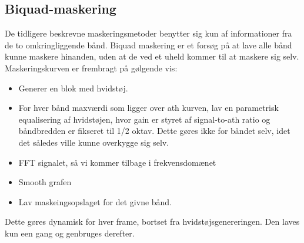 \subsection*{Biquad-maskering}
De tidligere beskrevne maskeringsmetoder benytter sig kun af
informationer fra de to omkringliggende bånd. Biquad maskering er et
forsøg på at lave alle bånd kunne maskere hinanden, uden at de ved et
uheld kommer til at maskere sig selv.\\
Maskeringskurven er frembragt på gølgende vis:
\begin{itemize}
\item Generer en blok med hvidstøj.
\item For hver bånd maxværdi som ligger over ath kurven, lav en parametrisk
  equalisering af hvidstøjen, hvor gain er styret af signal-to-ath
  ratio og båndbredden er fikseret til 1/2 oktav. Dette gøres ikke for
  båndet selv, idet det således ville kunne overkygge sig selv.
\item FFT signalet, så vi kommer tilbage i frekvensdomænet
\item Smooth grafen
\item Lav maskeingsopslaget for det givne bånd.
\end{itemize}
Dette gøres dynamisk for hver frame, bortset fra
hvidstøjsgenereringen. Den laves kun een gang og genbruges derefter.

